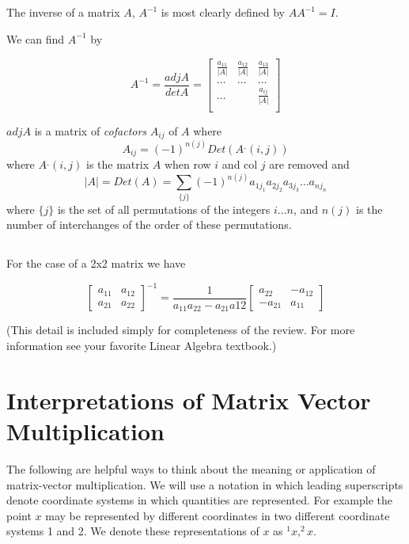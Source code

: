 \subsection{}
The inverse of a matrix $A$, $A^{-1}$ is most clearly defined by $AA^{-1} = I$.

We can find $A^{-1}$ by

\[
A^{-1} =  \frac{adj A}{det A} =
\left [
\begin{array}{ccc}
\frac{a_{11}}{|A|}      &   \frac{a_{12}}{|A|}      &   \frac{a_{13}}{|A|}     \\
 \dots                  &    \dots                  &  \dots                   \\
\dots                   &                           &  \frac{a_{ij}}{|A|}      \\
\end{array}
\right ]
\]

$adjA$ is a matrix of {\it cofactors} $A_{ij}$ of $A$ where
\[
A_{ij}  = (-1)^{n(j)}Det(A^{\_}(i,j))
\]
where $A^{\_}(i,j)$ is the matrix $A$ when row $i$ and col $j$ are removed and
\[
|A| = Det(A) = \sum_{\{j\}} (-1)^{n(j)} a_{1j_1}a_{2j_2}a_{3j_3}\dots a_{nj_n}
\]
where $\{j\}$ is the set of all permutations of the integers $i \dots n$, and $n(j)$ is the number of interchanges of the order of these permutations.


\subsection{}\label{2x2MatrixInverse}
For the case of a 2x2 matrix we have

\[
\begin{bmatrix} a_{11} & a_{12} \\ a_{21} & a_{22} \end{bmatrix} ^{-1} = \frac{1}{a_{11}a_{22}-a_{21}a{12}}
\begin{bmatrix} a_{22} & -a_{12} \\ -a_{21} & a_{11} \end{bmatrix}
\]






(This detail is included simply for completeness of the review.  For more information see your favorite Linear Algebra textbook.)




\newpage

\section{Interpretations of Matrix Vector Multiplication}
The following are helpful ways to think about the meaning or application of matrix-vector multiplication.
We will use a notation in which leading superscripts denote coordinate systems in which quantities are represented.  For example the
point $x$ may be represented by different coordinates in two different coordinate systems 1 and 2.    We denote these representations of
$x$ as $^1x, ^2x$.


